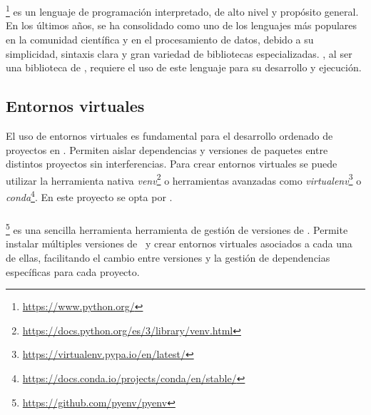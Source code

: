 \pagestyle{fancy}
\fancyhead[l]{\autorUO}
\fancyfoot[l]{\asignaturaAbbr}
\fancyfoot[r]{\fecha}

\section{\python} \label{sec:intro_python}
\python\footnote{\url{https://www.python.org/}} es un lenguaje de programación interpretado, de alto nivel y propósito general.
En los últimos años, se ha consolidado como uno de los lenguajes más populares en la comunidad científica y en el procesamiento de datos,
debido a su simplicidad, sintaxis clara y gran variedad de bibliotecas especializadas. \pytorch, al ser una biblioteca de \python,
requiere el uso de este lenguaje para su desarrollo y ejecución.

\subsection{Entornos virtuales} \label{sec:intro_virtualenv}
El uso de entornos virtuales es fundamental para el desarrollo ordenado de proyectos en \python. Permiten aislar dependencias y versiones
de paquetes entre distintos proyectos sin interferencias. Para crear entornos virtuales se puede utilizar la herramienta nativa
\textit{venv}\footnote{\url{https://docs.python.org/es/3/library/venv.html}} o herramientas avanzadas como
\textit{virtualenv}\footnote{\url{https://virtualenv.pypa.io/en/latest/}} o \textit{conda}\footnote{\url{https://docs.conda.io/projects/conda/en/stable/}}.
En este proyecto se opta por \pyenv.

\subsubsection{\pyenv} \label{sec:intro_pyenv}
\pyenv\footnote{\url{https://github.com/pyenv/pyenv}} es una sencilla herramienta herramienta de gestión de versiones de \python.
Permite instalar múltiples versiones de \python\ y crear entornos virtuales asociados a cada una de ellas, facilitando
el cambio entre versiones y la gestión de dependencias específicas para cada proyecto.

